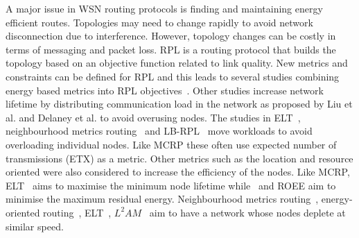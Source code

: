 A major issue in WSN routing protocols is finding and maintaining energy efficient routes.  Topologies may need to change rapidly to avoid network disconnection due to interference.  However, topology changes can be costly in terms of messaging and packet loss.  RPL is a routing protocol that builds the topology based on an objective function related to link quality.  New metrics and constraints can be defined for RPL and this leads to several studies combining energy based metrics into RPL objectives~\cite{energyrpl,energyLHC,elt,customOF,roee,compositeMetric,caof}.  Other studies increase network lifetime by distributing communication load in the network as proposed by Liu et al. \cite{loadbalance} and Delaney et al. \cite{spreadload} to avoid overusing nodes.  The studies in ELT~\cite{elt}, neighbourhood metrics routing~\cite{spreadload} and LB-RPL~\cite{loadbalance} move workloads to avoid overloading individual nodes.  Like MCRP these often use expected number of transmissions (ETX) as a metric. Other metrics such as the location and resource oriented were also considered to increase the efficiency of the nodes.
Like MCRP,  ELT~\cite{elt} aims to maximise the minimum node lifetime while~\cite{energyrpl} and ROEE \cite{roee} aim to minimise the maximum residual energy. Neighbourhood metrics routing~\cite{spreadload}, energy-oriented routing~\cite{loadbalance}, ELT~\cite{elt}, $L^{2}AM$~\cite{compositeMetric,customOF} aim to have a network whose nodes deplete at similar speed.  
 
